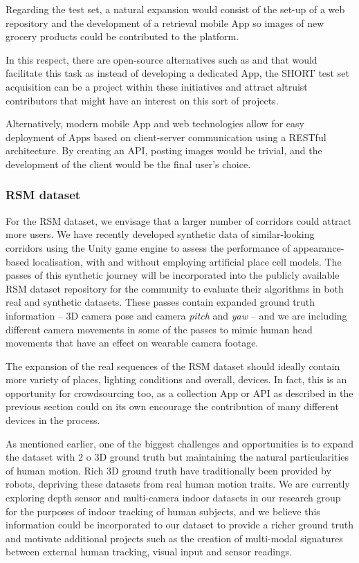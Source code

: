Regarding the test set, a natural expansion would consist of the set-up of a web repository and the development of a retrieval mobile App so images of new grocery products could be contributed to the platform.

In this respect, there are open-source alternatives such as \cite{apple} and \cite{google} that would facilitate this task as instead of developing a dedicated App, the SHORT test set acquisition can be a project within these initiatives and attract altruist contributors that might have an interest on this sort of projects.

Alternatively, modern mobile App and web technologies allow for easy deployment of Apps based on client-server communication using a RESTful architecture. By creating an API, posting images would be trivial, and the development of the client would be the final user's choice.

\subsubsection{RSM dataset}
\label{sec:futureRSM}
For the RSM dataset, we envisage that a larger number of corridors could attract more users. We have recently developed synthetic data of similar-looking corridors using the Unity game engine to assess the performance of appearance-based localisation, with and without employing artificial place cell models. The passes of this synthetic journey will be incorporated into the publicly available RSM dataset repository for the community to evaluate their algorithms in both real and synthetic datasets. These passes contain expanded ground truth information -- 3D camera pose and camera \textit{pitch} and \textit{yaw} --  and we are including different camera movements in some of the passes to mimic human head movements that have an effect on wearable camera footage.

The expansion of the real sequences of the RSM dataset should ideally contain more variety of places, lighting conditions and overall, devices. In fact, this is an opportunity for crowdsourcing too, as a collection App or API as described in the previous section could on its own encourage the contribution of many different devices in the process.

As mentioned earlier, one of the biggest challenges and opportunities is to expand the dataset with 2 o 3D ground truth but maintaining the natural particularities of human motion. Rich 3D ground truth have traditionally been provided by ro\-bots, depriving these datasets from real human motion traits. We are currently exploring depth sensor and multi-camera indoor datasets in our research group for the purposes of indoor tracking of human subjects, and we believe this information could be incorporated to our dataset to provide a richer ground truth and motivate additional projects such as the creation of multi-modal signatures between external human tracking, visual input and sensor readings.

